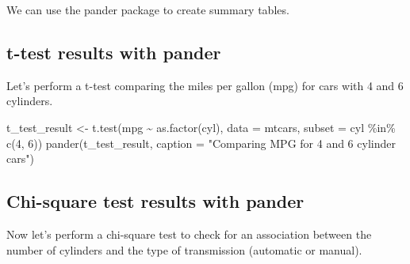\documentclass[
]{book}
\newenvironment{Shaded}{\begin{snugshade}}{\end{snugshade}}
\newcommand{\AttributeTok}[1]{\textcolor[rgb]{0.77,0.63,0.00}{#1}}
\newcommand{\CommentTok}[1]{\textcolor[rgb]{0.56,0.35,0.01}{\textit{#1}}}
\newcommand{\DecValTok}[1]{\textcolor[rgb]{0.00,0.00,0.81}{#1}}
\newcommand{\FunctionTok}[1]{\textcolor[rgb]{0.00,0.00,0.00}{#1}}
\newcommand{\NormalTok}[1]{#1}
\newcommand{\OtherTok}[1]{\textcolor[rgb]{0.56,0.35,0.01}{#1}}
\newcommand{\SpecialCharTok}[1]{\textcolor[rgb]{0.00,0.00,0.00}{#1}}
\newcommand{\StringTok}[1]{\textcolor[rgb]{0.31,0.60,0.02}{#1}}
\begin{document}
We can use the pander package to create summary tables.

\begin{Shaded}
\end{Shaded}

\hypertarget{t-test-results-with-pander}{%
\subsection{t-test results with pander}\label{t-test-results-with-pander}}

Let's perform a t-test comparing the miles per gallon (mpg) for cars with 4 and 6 cylinders.

\begin{Shaded}
\begin{Highlighting}[]
\NormalTok{t\_test\_result }\OtherTok{\textless{}{-}} \FunctionTok{t.test}\NormalTok{(mpg }\SpecialCharTok{\textasciitilde{}} \FunctionTok{as.factor}\NormalTok{(cyl), }\AttributeTok{data =}\NormalTok{ mtcars, }\AttributeTok{subset =}\NormalTok{ cyl }\SpecialCharTok{\%in\%} \FunctionTok{c}\NormalTok{(}\DecValTok{4}\NormalTok{, }\DecValTok{6}\NormalTok{))}
\FunctionTok{pander}\NormalTok{(t\_test\_result, }\AttributeTok{caption =} \StringTok{"Comparing MPG for 4 and 6 cylinder cars"}\NormalTok{)}
\end{Highlighting}
\end{Shaded}

\hypertarget{chi-square-test-results-with-pander}{%
\subsection{Chi-square test results with pander}\label{chi-square-test-results-with-pander}}

Now let's perform a chi-square test to check for an association between the number of cylinders and the type of transmission (automatic or manual).

\begin{Shaded}
\end{Shaded}
\end{document}
